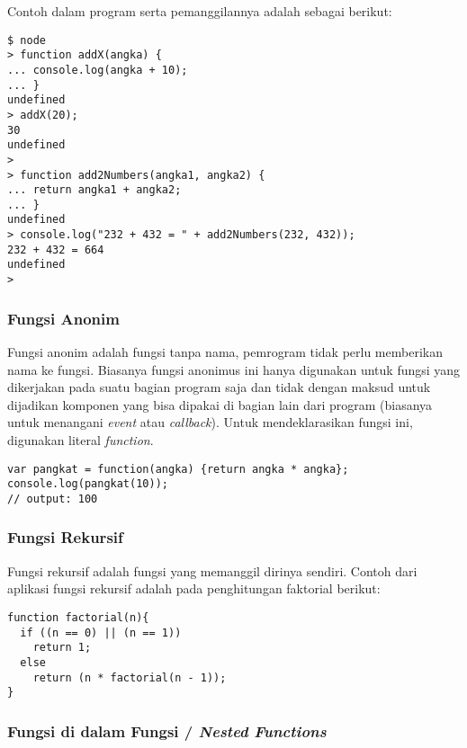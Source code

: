 Contoh dalam program serta pemanggilannya adalah sebagai berikut:

\lstset{language=bash,caption=Contoh deklarasi fungsi dan pemanggilannya}
\begin{lstlisting}
$ node
> function addX(angka) {
... console.log(angka + 10);
... }
undefined
> addX(20);
30
undefined
>
> function add2Numbers(angka1, angka2) {
... return angka1 + angka2;
... }
undefined
> console.log("232 + 432 = " + add2Numbers(232, 432));
232 + 432 = 664
undefined
>
\end{lstlisting}

\subsubsection{Fungsi Anonim}

Fungsi anonim adalah fungsi tanpa nama, pemrogram tidak perlu memberikan nama ke fungsi. Biasanya fungsi anonimus ini hanya digunakan untuk fungsi yang dikerjakan pada suatu bagian program saja dan tidak dengan maksud untuk dijadikan komponen yang bisa dipakai di bagian lain dari program (biasanya untuk menangani \textit{event} atau \textit{callback}). Untuk mendeklarasikan fungsi ini, digunakan literal \textit{function}.

\lstset{language=JavaScript,caption=Fungsi anonim}
\begin{lstlisting}
var pangkat = function(angka) {return angka * angka};
console.log(pangkat(10));
// output: 100
\end{lstlisting}

\subsubsection{Fungsi Rekursif}

Fungsi rekursif adalah fungsi yang memanggil dirinya sendiri. Contoh dari aplikasi fungsi rekursif adalah pada penghitungan faktorial berikut:

\lstset{language=JavaScript,caption=Fungsi rekursif untuk menghitung faktorial}
\begin{lstlisting}
function factorial(n){
  if ((n == 0) || (n == 1))
    return 1;
  else
    return (n * factorial(n - 1));
}
\end{lstlisting}

\subsubsection{Fungsi di dalam Fungsi / \textit{Nested Functions}}

